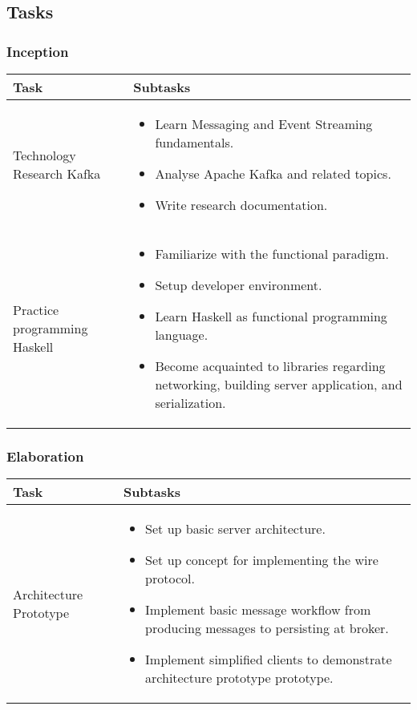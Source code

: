 \newpage
\subsection*{Tasks}
\label{subsec:tasks}
\subsubsection*{Inception}


\begin{tabular}[H]{|p{6cm}|p{7.5cm}|}\hline
    \textbf{Task} & \textbf{Subtasks} \\ \hline
    Technology Research Kafka & 
        \begin{itemize}
            \item Learn Messaging and Event Streaming fundamentals.
            \item Analyse Apache Kafka and related topics. 
            \item Write research documentation.
        \end{itemize} \\ \hline
    Practice programming Haskell & 
        \begin{itemize}
            \item Familiarize with the functional paradigm.
            \item Setup developer environment. 
            \item Learn Haskell as functional programming language.
            \item Become acquainted to libraries regarding networking,
              building server application, and serialization.
        \end{itemize} \\ \hline
\end{tabular}

\subsubsection*{Elaboration}
\begin{tabular}[H]{|p{6cm}|p{7.5cm}|}\hline
   \textbf{Task} & \textbf{Subtasks} \\ \hline
    Architecture Prototype &
        \begin{itemize}
            \item Set up basic server architecture.
            \item Set up concept for implementing the wire protocol.
            \item Implement basic message workflow from producing messages to
            persisting at broker.
            \item Implement simplified clients to demonstrate architecture
                prototype prototype.
        \end{itemize} \\ \hline
   \end{tabular}

